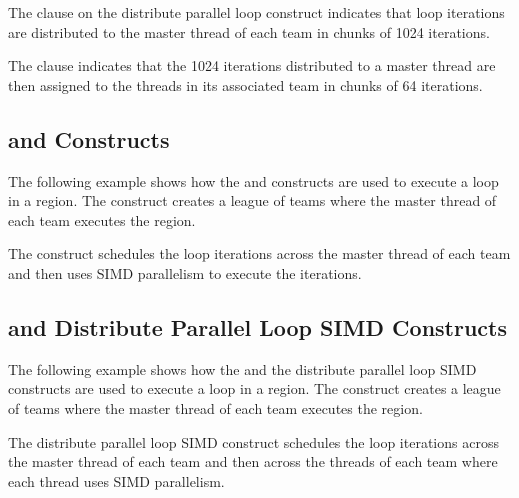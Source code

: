 The  clause on the distribute parallel loop construct indicates 
that loop iterations are distributed to the master thread of each team in chunks 
of 1024 iterations.

The  clause indicates that the 1024 iterations distributed to 
a master thread are then assigned to the threads in its associated team in chunks 
of 64 iterations.



\subsection{  and   Constructs}
\label{subsec:teams_distribute_simd}

The following example shows how the   and  
 constructs are used to execute a loop in a  region. 
The   construct creates a league of teams where the 
master thread of each team executes the  region.

The   construct schedules the loop iterations across 
the master thread of each team and then uses SIMD parallelism to execute the iterations.



\subsection{  and Distribute Parallel Loop SIMD Constructs}
\label{subsec:teams_distribute_parallel_simd}

The following example shows how the   and the distribute 
parallel loop SIMD constructs are used to execute a loop in a   
region. The   construct creates a league of teams 
where the master thread of each team executes the  region.

The distribute parallel loop SIMD construct schedules the loop iterations across 
the master thread of each team and then across the threads of each team where each 
thread uses SIMD parallelism.



